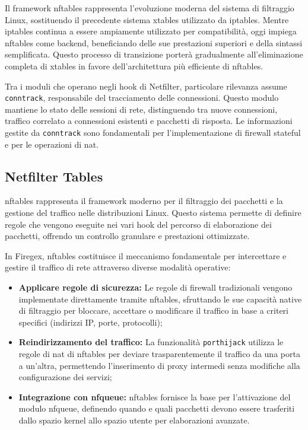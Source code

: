Il framework \gls{nftables} rappresenta l'evoluzione moderna del sistema di filtraggio Linux, sostituendo il precedente sistema xtables utilizzato da iptables. Mentre iptables continua a essere ampiamente utilizzato per compatibilità, oggi impiega \gls{nftables} come backend, beneficiando delle sue prestazioni superiori e della sintassi semplificata. Questo processo di transizione porterà gradualmente all'eliminazione completa di xtables in favore dell'architettura più efficiente di \gls{nftables}.

Tra i moduli che operano negli hook di Netfilter, particolare rilevanza assume \texttt{conntrack}, responsabile del tracciamento delle connessioni. Questo modulo mantiene lo stato delle sessioni di rete, distinguendo tra nuove connessioni, traffico correlato a connessioni esistenti e pacchetti di risposta. Le informazioni gestite da \texttt{conntrack} sono fondamentali per l'implementazione di firewall stateful e per le operazioni di \gls{nat}.

\subsection{Netfilter Tables}

\gls{nftables} rappresenta il framework moderno per il filtraggio dei pacchetti e la gestione del traffico nelle distribuzioni Linux. Questo sistema permette di definire regole che vengono eseguite nei vari hook del percorso di elaborazione dei pacchetti, offrendo un controllo granulare e prestazioni ottimizzate.

In Firegex, \gls{nftables} costituisce il meccanismo fondamentale per intercettare e gestire il traffico di rete attraverso diverse modalità operative:

\begin{itemize}
    \item \textbf{Applicare regole di sicurezza:} Le regole di firewall tradizionali vengono implementate direttamente tramite \gls{nftables}, sfruttando le sue capacità native di filtraggio per bloccare, accettare o modificare il traffico in base a criteri specifici (indirizzi IP, porte, protocolli);

    \item \textbf{Reindirizzamento del traffico:} La funzionalità \texttt{\gls{porthijack}} utilizza le regole di \gls{nat} di \gls{nftables} per deviare trasparentemente il traffico da una porta a un'altra, permettendo l'inserimento di proxy intermedi senza modifiche alla configurazione dei servizi;

    \item \textbf{Integrazione con \gls{nfqueue}:} \gls{nftables} fornisce la base per l'attivazione del modulo \gls{nfqueue}, definendo quando e quali pacchetti devono essere trasferiti dallo spazio kernel allo spazio utente per elaborazioni avanzate.
\end{itemize}

